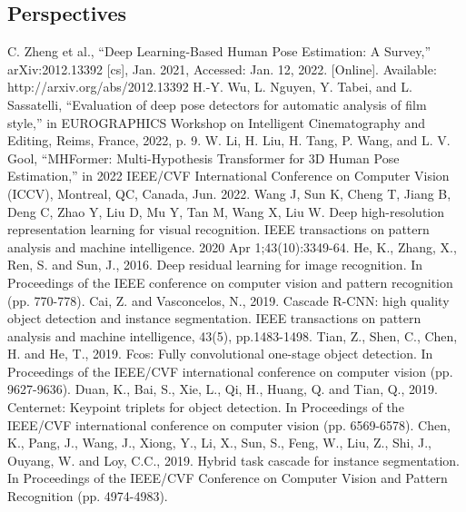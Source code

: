 \documentclass[runningheads]{llncs}
\begin{document}
\subsection{Perspectives}



\begin{thebibliography}{8}
   C. Zheng et al., “Deep Learning-Based Human Pose Estimation: A Survey,” arXiv:2012.13392 [cs], Jan. 2021, Accessed: Jan. 12, 2022. [Online]. Available: http://arxiv.org/abs/2012.13392
   H.-Y. Wu, L. Nguyen, Y. Tabei, and L. Sassatelli, “Evaluation of deep pose detectors for automatic analysis of film style,” in EUROGRAPHICS Workshop on Intelligent Cinematography and Editing, Reims, France, 2022, p. 9.
   W. Li, H. Liu, H. Tang, P. Wang, and L. V. Gool, “MHFormer: Multi-Hypothesis Transformer for 3D Human Pose Estimation,” in 2022 IEEE/CVF International Conference on Computer Vision (ICCV), Montreal, QC, Canada, Jun. 2022.
   Wang J, Sun K, Cheng T, Jiang B, Deng C, Zhao Y, Liu D, Mu Y, Tan M, Wang X, Liu W. Deep high-resolution representation learning for visual recognition. IEEE transactions on pattern analysis and machine intelligence. 2020 Apr 1;43(10):3349-64.
   He, K., Zhang, X., Ren, S. and Sun, J., 2016. Deep residual learning for image recognition. In Proceedings of the IEEE conference on computer vision and pattern recognition (pp. 770-778).
   Cai, Z. and Vasconcelos, N., 2019. Cascade R-CNN: high quality object detection and instance segmentation. IEEE transactions on pattern analysis and machine intelligence, 43(5), pp.1483-1498.
   Tian, Z., Shen, C., Chen, H. and He, T., 2019. Fcos: Fully convolutional one-stage object detection. In Proceedings of the IEEE/CVF international conference on computer vision (pp. 9627-9636).
   Duan, K., Bai, S., Xie, L., Qi, H., Huang, Q. and Tian, Q., 2019. Centernet: Keypoint triplets for object detection. In Proceedings of the IEEE/CVF international conference on computer vision (pp. 6569-6578).
   Chen, K., Pang, J., Wang, J., Xiong, Y., Li, X., Sun, S., Feng, W., Liu, Z., Shi, J., Ouyang, W. and Loy, C.C., 2019. Hybrid task cascade for instance segmentation. In Proceedings of the IEEE/CVF Conference on Computer Vision and Pattern Recognition (pp. 4974-4983).
\end{thebibliography}
\end{document}
